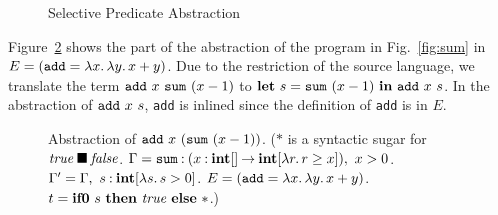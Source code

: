 \begin{figure}[t]
\begin{minipage}{\textwidth}
 {}

\medskip

 {}

%

%
\end{minipage}
\caption{Selective Predicate Abstraction}
\label{fig:abstraction}
\end{figure}

Figure~\ref{fig:abst-example} shows the part of the abstraction of the
program in Fig.~\ref{fig:sum} in $E =
(\mathtt{add}=\lambda{x}.\,{\lambda{y}.\,{x+y}})$.  Due to the restriction of the
source language, we translate the term
${{\mathtt{add}}~{x}}~{{\mathtt{sum}}~{(x-1)}}$ to
$\mathbf{let}\ {s} = {{\mathtt{sum}}~{(x-1)}}\ \mathbf{in}\ {{{\mathtt{add}}~{x}}~{s}}$.
In the abstraction of ${{\mathtt{add}}~{x}}~{s}$, \texttt{add} is
inlined since the definition of \texttt{add} is in $E$.

\begin{figure}[t]

\caption{Abstraction of ${{\mathtt{add}}~{x}}~{({\mathtt{sum}}~{(x-1)})}$.
 ($*$ is a syntactic sugar for ${\mathit{true}}\mathbin{\blacksquare}{\mathit{false}}$.
  $\Gamma = \mathtt{sum}\mathbin{:}({x\mathbin{:}\mathbf{int}[]}\mathbin{\rightarrow}{\mathbf{int}[\lambda{r}.\,{r \geq x}]}),~ x>0$.
  $\Gamma' = \Gamma,~s\mathbin{:}\mathbf{int}[\lambda{s}.\,{s>0}]$.
  $E = (\mathtt{add}=\lambda{x}.\,{\lambda{y}.\,{x+y}})$.
  $t = \mathbf{if0}~{s}~\mathbf{then}~{\mathit{true}}~\mathbf{else}~{*}$.)}
\label{fig:abst-example}
\end{figure}

